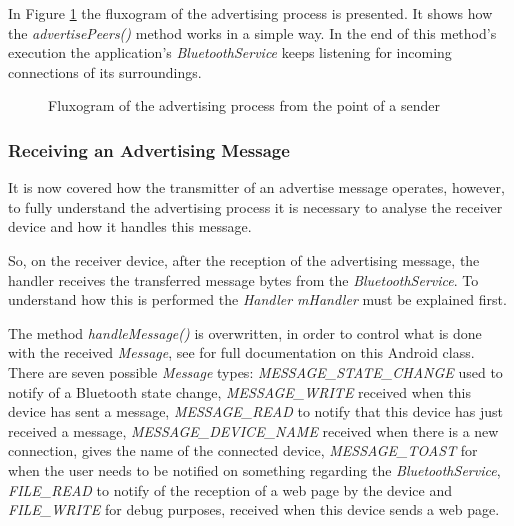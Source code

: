 In Figure \ref{fig:advflux} the fluxogram of the advertising process is presented. It shows how the \textit{advertisePeers()} method works in a simple way. In the end of this method's execution the application's \textit{BluetoothService} keeps listening for incoming connections of its surroundings.

\begin{figure}[ht]
   \noindent{}
	\caption{\label{fig:advflux} Fluxogram of the advertising process from the point of a sender}
\end{figure}

\subsubsection{Receiving an Advertising Message}
\label{subsubsec:rcvadv}

It is now covered how the transmitter of an advertise message operates, however, to fully understand the advertising process it is necessary to analyse the receiver device and how it handles this message.

So, on the receiver device, after the reception of the advertising message, the handler receives the transferred message bytes from the \textit{BluetoothService}. To understand how this is performed the \textit{Handler mHandler} must be explained first.

The method \textit{handleMessage()} is overwritten, in order to control what is done with the received \textit{Message}, see \cite{msgclass} for full documentation on this Android class. There are seven possible \textit{Message} types: \textit{MESSAGE\_STATE\_CHANGE} used to notify of a Bluetooth state change, \textit{MESSAGE\_WRITE} received when this device has sent a message, \textit{MESSAGE\_READ} to notify that this device has just received a message, \textit{MESSAGE\_DEVICE\_NAME} received when there is a new connection, gives the name of the connected device, \textit{MESSAGE\_TOAST} for when the user needs to be notified on something regarding the \textit{BluetoothService}, \textit{FILE\_READ} to notify of the reception of a web page by the device and \textit{FILE\_WRITE} for debug purposes, received when this device sends a web page.

